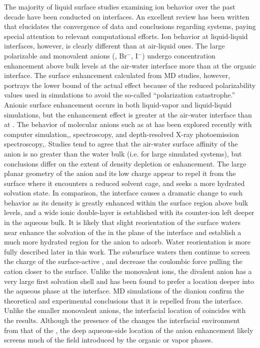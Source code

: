 The majority of liquid surface studies examining ion behavior over the past decade have been conducted on \airwat interfaces. An excellent review has been written that elucidates the convergence of data and conclusions regarding \airwat systems, paying special attention to relevant computational efforts.\cite{Jungwirth2006} Ion behavior at liquid-liquid interfaces, however, is clearly different than at air-liquid ones. The large polarizable and monovalent anions (\cl, Br$^-$, I$^-$) undergo concentration enhancement above bulk levels at the air-water interface more than at the organic interface.\cite{Wick2006c,Wick2007a} The surface enhancement calculated from MD studies, however, portrays the lower bound of the actual effect because of the reduced polarizability values used in simulations to avoid the so-called ``polarization catastrophe.'' Anionic surface enhancement occurs in both liquid-vapor and liquid-liquid simulations, but the enhancement effect is greater at the air-water interface than at \ctcwat.\cite{Wick2007a} The behavior of molecular anions such as \nit at \airwat has been explored recently with computer simulation,\cite{Thomas2007,Miller2009}, spectroscopy,\cite{Soule2007,Xu2009,Otten2007} and depth-resolved X-ray photoemission spectroscopy,\cite{Brown2009}. Studies tend to agree that the air-water surface affinity of the \nit anion is no greater than the water bulk (i.e. for large simulated systems), but conclusions differ on the extent of density depletion or enhancement. The large planar geometry of the \nit anion and its low charge appear to repel it from the \airwat surface where it encounters a reduced solvent cage, and seeks a more hydrated solvation state. In comparison, the \ctcwat interface causes a dramatic change to such \nit behavior as its density is greatly enhanced within the surface region above bulk levels, and a wide ionic double-layer is established with its counter-ion left deeper in the aqueous bulk. It is likely that slight reorientation of the surface waters near \ctc enhance the solvation of the \nit in the plane of the interface and establish a much more hydrated region for the anion to adsorb. Water reorientation is more fully described later in this work. The subsurface waters then continue to screen the charge of the surface-active \nit, and decrease the coulombic force pulling the cation closer to the surface. Unlike the monovalent ions, the divalent \sul anion has a very large first solvation shell and has been found to prefer a location deeper into the aqueous phase at the \airwat interface.\cite{Salvador2003} MD simulations of the \sul dianion confirm the theoretical and experimental conclusions that it is repelled from the \airwat interface.\cite{Gopalakrishnan2005} Unlike the smaller monovalent anions, the \airwat interfacial location of \sul coincides with the \ctcwat results. Although the presence of the \ctc changes the interfacial environment from that of the \airwat, the deep aqueous-side location of the \sul anion enhancement likely screens much of the field introduced by the organic or vapor phases.

